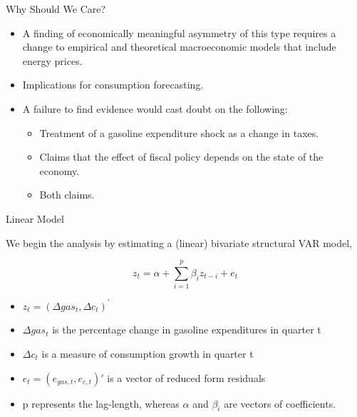 \documentclass[
  10pt,
  ignorenonframetext,
]{beamer}
\providecommand{\tightlist}{%
  \setlength{\itemsep}{0pt}\setlength{\parskip}{0pt}}
\begin{document}
\begin{frame}{Why Should We Care?}
\protect\hypertarget{why-should-we-care}{}

\begin{itemize}
\item
  A finding of economically meaningful asymmetry of this type requires a
  change to empirical and theoretical macroeconomic models that include
  energy prices.
\item
  Implications for consumption forecasting.
\item
  A failure to find evidence would cast doubt on the following:

  \begin{itemize}
  \tightlist
  \item
    Treatment of a gasoline expenditure shock as a change in taxes.
  \item
    Claims that the effect of fiscal policy depends on the state of the
    economy.
  \item
    Both claims.
  \end{itemize}
\end{itemize}

\end{frame}

\begin{frame}{Linear Model}
\protect\hypertarget{linear-model}{}

We begin the analysis by estimating a (linear) bivariate structural VAR
model,

\[z_{t}=\alpha+\sum_{i=1}^{p}\beta_{i}z_{t-i}+e_{t}\]

\begin{itemize}
\tightlist
\item
  \(z_{t}=(\Delta gas_{t}, \Delta c_t)^{\prime}\)
\item
  \(\Delta gas_{t}\) is the percentage change in gasoline expenditures
  in quarter t
\item
  \(\Delta c_{t}\) is a measure of consumption growth in quarter t
\item
  \(e_{t}=(e_{gas,t}, e_{c,t})'\) is a vector of reduced form residuals
\item
  p represents the lag-length, whereas \(\alpha\) and \(\beta_{i}\) are
  vectors of coefficients.
\end{itemize}

\end{frame}
\end{document}
